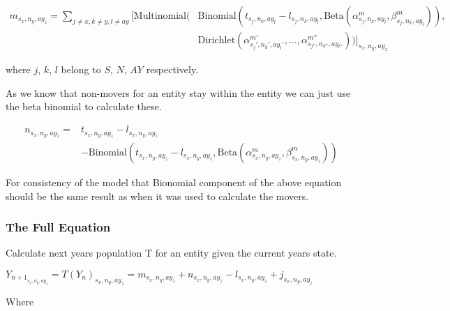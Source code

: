 \documentclass[margin=5mm]{article}
\begin{document}
\begin{equation*}
  \begin{split}
    m_{s_x,n_y,ay_z} = \sum_{j \neq x, k \neq y , l \neq ay }\bigg[
        \text{Multinomial}( & \text{Binomial}(t_{s_j,n_k,ay_l} - l_{s_j,n_k,ay_l}, 
        \text{Beta}(\alpha^m_{s_j,n_k,ay_l},\beta^m_{s_j,n_k,ay_l})),
        \\ &  \text{Dirichlet}(\alpha^{m'}_{s_j',n_k',ay_l'}, \dots,
        \alpha^{m''}_{s_{j''},n_{k''},ay_{l''}}))\bigg]_{s_x,n_y,ay_z}
\end{split}
\end{equation*}

where $j$, $k$, $l$ belong to $S$, $N$, $AY$ respectively.

As we know that non-movers for an entity stay within the entity we can
just use the beta binomial to calculate these.

\begin{equation*}
  \begin{split}
    n_{s_x,n_y,ay_z} = & t_{s_x,n_y,ay_z}
    - l_{s_x,n_y,ay_z} \\ & - \text{Binomial}(t_{s_x,n_y,ay_z} - l_{s_x,n_y,ay_z}, 
\text{Beta}(\alpha^m_{s_x,n_y,ay_z},\beta^m_{s_x,n_y,ay_z}))
\end{split}
\end{equation*}

For consistency of the model that Bionomial component of the above
equation should be the same result as when it was used to calculate
the movers.

\subsubsection{The Full Equation}

Calculate next years population T for an entity given the current
years state.

$Y_{n+1}_{s_x,n_y,ay_z} = T(Y_n)_{s_x,n_y,ay_z} = m_{s_x,n_y,ay_z} + n_{s_x,n_y,ay_z} -
l_{s_x,n_y,ay_z} + j_{s_x,n_y,ay_z} $

Where
\end{document}
